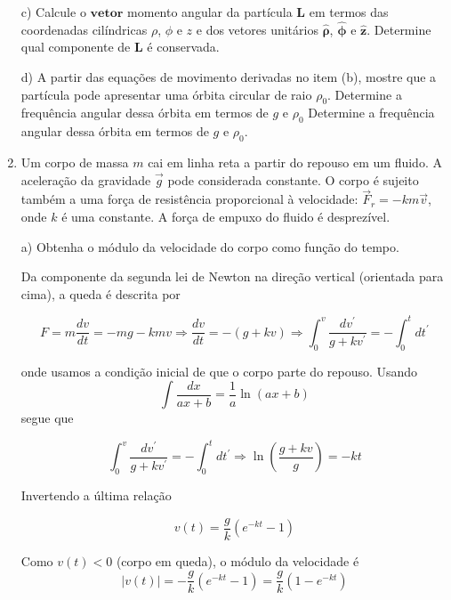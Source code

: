 \begin{enumerate}[start=1,label={\bfseries Q\arabic*.}]
c) Calcule o $\mathbf{vetor}$ momento angular da partícula $\mathbf{L}$ em termos das coordenadas cilíndricas $\rho$, $\phi$ e $z$ e dos vetores unitários $\hat{\mathbf{\rho}}$, $\hat{\mathbf{\phi}}$ e $\hat{\mathbf{z}}$. Determine qual componente de $\mathbf{L}$ é conservada.

\resposta

d) A partir das equações de movimento derivadas no item (b), mostre que a partícula pode apresentar uma órbita circular de raio $\rho_{0}$. Determine a frequência angular dessa órbita em termos de $g$ e $\rho_{0}$ Determine a frequência angular dessa órbita em termos de $g$ e $\rho_{0}$.

\resposta





\item Um corpo de massa $m$ cai em linha reta a partir do repouso em um fluido. A aceleração da gravidade $\vec{g}$ pode considerada constante. O corpo é sujeito também a uma força de resistência proporcional à velocidade: $\vec{F}_{r} = -km\vec{v}$, onde $k$ é uma constante. A força de empuxo do fluido é desprezível.


a) Obtenha o módulo da velocidade do corpo como função do tempo.

\resposta Da componente da segunda lei de Newton na direção vertical (orientada para cima), a queda é descrita por

\begin{equation}\label{eq:queda}
F=m \frac{d v}{d t}=-m g-k m v \Rightarrow \frac{d v}{d t}=-(g+k v) \Rightarrow \int_{0}^{v} \frac{d v^{\prime}}{g+k v^{\prime}}=-\int_{0}^{t} d t^{\prime}
\end{equation}

onde usamos a condição inicial de que o corpo parte do repouso. Usando
$$
\int \frac{d x}{a x+b}=\frac{1}{a} \ln (a x+b)
$$
segue que

\begin{equation}\label{eq:integrando}
\int_{0}^{v} \frac{d v^{\prime}}{g+k v^{\prime}}=-\int_{0}^{t} d t^{\prime} \Rightarrow \ln \left(\frac{g+k v}{g}\right)=-k t
\end{equation}

Invertendo a última relação

\begin{equation}\label{eq:ob-v}
v(t)=\frac{g}{k}\left(e^{-k t}-1\right)
\end{equation}

Como $v(t)<0$ (corpo em queda), o módulo da velocidade é
$$
|v(t)|=-\frac{g}{k}\left(e^{-k t}-1\right)=\frac{g}{k}\left(1-e^{-k t}\right)
$$


\end{enumerate}
